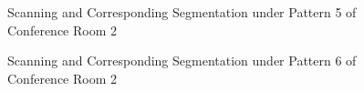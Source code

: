 \documentclass[11pt, a4paper,oneside,chapterprefix=false]{scrbook}
\begin{document}
\begin{figure}[H]
    \centering
      \label{fig:conf2 5 occluded} \hfill
     \label{fig:conf2 5 seg}
    \caption{Scanning and Corresponding Segmentation under Pattern 5 of Conference Room 2}
    \label{fig:conf2 5 occ and seg}
\end{figure}

\begin{figure}[H]
    \centering
      \label{fig:conf2 6 occluded} \hfill
     \label{fig:conf2 6 seg}
    \caption{Scanning and Corresponding Segmentation under Pattern 6 of Conference Room 2}
    \label{fig:conf2 6 occ and seg}
\end{figure}
\end{document}
